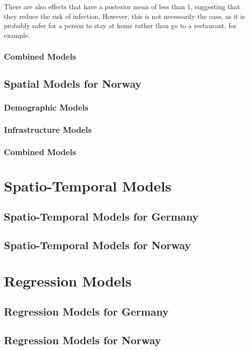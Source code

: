There are also effects that have a posterior mean of less than 1, suggesting that they reduce the risk of infection. However, this is not necessarily the case, as it is probably safer for a person to stay at home rather than go to a restaurant, for example.
\subsubsection{Combined Models}
\subsection{Spatial Models for Norway}
\subsubsection{Demographic Models}
\subsubsection{Infrastructure Models}
\subsubsection{Combined Models}
\clearpage
\section{Spatio-Temporal Models}
\subsection{Spatio-Temporal Models for Germany}
\subsection{Spatio-Temporal Models for Norway}
\section{Regression Models}
\clearpage
\subsection{Regression Models for Germany}
\subsection{Regression Models for Norway}